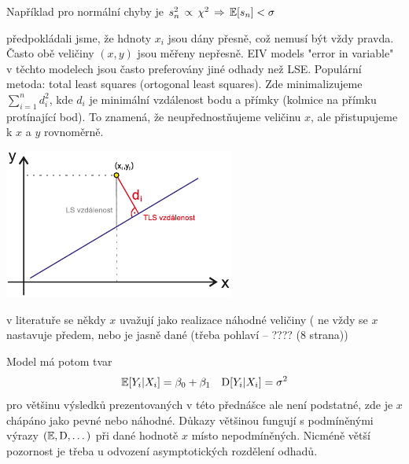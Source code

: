 Například pro normální chyby je $ s_{n}^{2} \, \propto \, \chi^{2} \, \Rightarrow \, \mathbb{E} [s_{n}] < \sigma $

\begin{remark}
	předpokládali jsme, že hdnoty $ x_{i} $ jsou dány přesně, což nemusí být vždy pravda. Často obě veličiny $ (x,y) $ jsou měřeny nepřesně. EIV models "error in variable" v těchto modelech jsou často preferovány jiné odhady než LSE. Populární metoda: total least squares (ortogonal least squares). Zde minimalizujeme $ \sum_{i=1}^{n} d_{i}^{2} $, kde $ d_{i} $ je minimální vzdálenost bodu a přímky (kolmice na přímku protínající bod). To znamená, že neupřednostňujeme veličinu $ x $, ale přistupujeme k $ x $ a $ y $ rovnoměrně.
\end{remark}
\begin{center}
    \includegraphics[scale=2.0]{pictures/picture_2_F.pdf}
\end{center}

\begin{remark}
v literatuře se někdy $ x $ uvažují jako realizace náhodné veličiny ( ne vždy se $ x $ nastavuje předem, nebo je jasně dané (třeba pohlaví -- ???? (8 strana)) 
\end{remark}
Model má potom tvar
$$
 \mathbb{E} [ Y_{i} \vert X_{i} ] = \beta_{0} + \beta_{1} \quad  \mathrm{D} [ Y_{i} \vert X_{i} ] = \sigma^{2}
$$
pro většinu výsledků prezentovaných v této přednášce ale není podstatné, zde je $ x $ chápáno jako pevné nebo náhodné.
Důkazy většinou fungují s podmíněnými výrazy $ ( \mathbb{E} , \mathrm{D} , \dots )  $ při dané hodnotě $ x $ místo nepodmíněných.
Nicméně větší pozornost je třeba u odvození asymptotických rozdělení odhadů.

